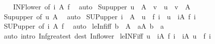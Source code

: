 \begin{isabellebody}
%
\isadelimproof
\ \ %
\endisadelimproof
%
\isatagproof
{}\isamarkupfalse%
\ INF{\isacharunderscore}{\kern0pt}lower\ {\isacharbrackleft}{\kern0pt}of\ i\ A\ f{\isacharbrackright}{\kern0pt}\ \isamarkupfalse%
\ auto%
\endisatagproof
{\isafoldproof}%
%
\isadelimproof
\isanewline
%
\endisadelimproof
\isanewline
{}\isamarkupfalse%
\ Sup{\isacharunderscore}{\kern0pt}upper{}{\isacharcolon}{\kern0pt}\ {\isachardoublequoteopen}u\ {\isasymin}\ A\ {\isasymLongrightarrow}\ v\ {\isasymle}\ u\ {\isasymLongrightarrow}\ v\ {\isasymle}\ {\isasymSqunion}A{\isachardoublequoteclose}\isanewline
%
\isadelimproof
\ \ %
\endisadelimproof
%
\isatagproof
{}\isamarkupfalse%
\ Sup{\isacharunderscore}{\kern0pt}upper\ {\isacharbrackleft}{\kern0pt}of\ u\ A{\isacharbrackright}{\kern0pt}\ \isamarkupfalse%
\ auto%
\endisatagproof
{\isafoldproof}%
%
\isadelimproof
\isanewline
%
\endisadelimproof
\isanewline
{}\isamarkupfalse%
\ SUP{\isacharunderscore}{\kern0pt}upper{}{\isacharcolon}{\kern0pt}\ {\isachardoublequoteopen}i\ {\isasymin}\ A\ {\isasymLongrightarrow}\ u\ {\isasymle}\ f\ i\ {\isasymLongrightarrow}\ u\ {\isasymle}\ {\isacharparenleft}{\kern0pt}{\isasymSqunion}i{\isasymin}A{\isachardot}{\kern0pt}\ f\ i{\isacharparenright}{\kern0pt}{\isachardoublequoteclose}\isanewline
%
\isadelimproof
\ \ %
\endisadelimproof
%
\isatagproof
{}\isamarkupfalse%
\ SUP{\isacharunderscore}{\kern0pt}upper\ {\isacharbrackleft}{\kern0pt}of\ i\ A\ f{\isacharbrackright}{\kern0pt}\ \isamarkupfalse%
\ auto%
\endisatagproof
{\isafoldproof}%
%
\isadelimproof
\isanewline
%
\endisadelimproof
\isanewline
{}\isamarkupfalse%
\ le{\isacharunderscore}{\kern0pt}Inf{\isacharunderscore}{\kern0pt}iff{\isacharcolon}{\kern0pt}\ {\isachardoublequoteopen}b\ {\isasymle}\ {\isasymSqinter}A\ {\isasymlongleftrightarrow}\ {\isacharparenleft}{\kern0pt}{\isasymforall}a{\isasymin}A{\isachardot}{\kern0pt}\ b\ {\isasymle}\ a{\isacharparenright}{\kern0pt}{\isachardoublequoteclose}\isanewline
%
\isadelimproof
\ \ %
\endisadelimproof
%
\isatagproof
{}\isamarkupfalse%
\ {\isacharparenleft}{\kern0pt}auto\ intro{\isacharcolon}{\kern0pt}\ Inf{\isacharunderscore}{\kern0pt}greatest\ dest{\isacharcolon}{\kern0pt}\ Inf{\isacharunderscore}{\kern0pt}lower{\isacharparenright}{\kern0pt}%
\endisatagproof
{\isafoldproof}%
%
\isadelimproof
\isanewline
%
\endisadelimproof
\isanewline
{}\isamarkupfalse%
\ le{\isacharunderscore}{\kern0pt}INF{\isacharunderscore}{\kern0pt}iff{\isacharcolon}{\kern0pt}\ {\isachardoublequoteopen}u\ {\isasymle}\ {\isacharparenleft}{\kern0pt}{\isasymSqinter}i{\isasymin}A{\isachardot}{\kern0pt}\ f\ i{\isacharparenright}{\kern0pt}\ {\isasymlongleftrightarrow}\ {\isacharparenleft}{\kern0pt}{\isasymforall}i{\isasymin}A{\isachardot}{\kern0pt}\ u\ {\isasymle}\ f\ i{\isacharparenright}{\kern0pt}{\isachardoublequoteclose}\isanewline

\end{isabellebody}
